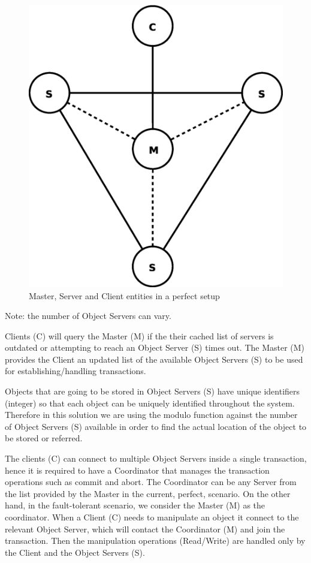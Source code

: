 \documentclass[times, 10pt,twocolumn]{article}
\begin{document}
\begin{figure}
\centering
\includegraphics[scale=0.3]{perfect.eps}
\caption{Master, Server and Client entities in a perfect setup}
\label{fig:perf}
\end{figure}

Note: the number of Object Servers can vary.

Clients (C) will query the Master (M) if the their cached list of servers is outdated or attempting to reach an Object Server (S) times out. The Master (M) provides the Client an updated list of the available Object Servers (S) to be used for establishing/handling transactions.

Objects that are going to be stored in Object Servers (S) have unique identifiers (integer) so that each object can be uniquely identified throughout the system. Therefore in this solution we are using the modulo function against the number of Object Servers (S) available in order to find the actual location of the object to be stored or referred.

The clients (C) can connect to multiple Object Servers inside a single transaction, hence it is required to have a Coordinator that manages the transaction operations such as commit and abort.
The Coordinator can be any Server from the list provided by the Master in the current, perfect, scenario. On the other hand, in the fault-tolerant scenario, we consider the Master (M) as the coordinator. When a Client (C) needs to manipulate an object it connect to the relevant Object Server, which will contact the Coordinator (M) and join the transaction. Then the manipulation operations (Read/Write) are handled only by the Client and the Object Servers (S).
\end{document}
